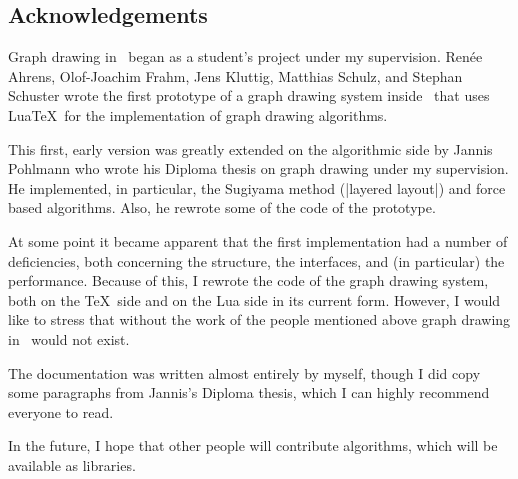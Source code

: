 \subsection{Acknowledgements}

Graph drawing in \tikzname\ began as a student's project under my
supervision. Ren\'ee Ahrens, Olof-Joachim Frahm, Jens
Kluttig, Matthias Schulz, and Stephan Schuster wrote the first
prototype of a graph drawing system inside \tikzname\ that uses
Lua\TeX\ for the implementation of graph drawing algorithms.

This first, early version was greatly extended on the algorithmic side
by Jannis Pohlmann who wrote his Diploma thesis on graph drawing under
my supervision. He implemented, in particular, the Sugiyama method
(|layered layout|) and force based algorithms. Also, he rewrote some
of the code of the prototype.

At some point it became apparent that the first implementation had a
number of deficiencies, both concerning the structure, the interfaces,
and (in particular) the performance. Because of this, I rewrote 
the code of the graph drawing system, both on the \TeX\ side
and on the Lua side in its current form. However, I would like to
stress that without the work of the people mentioned above graph
drawing in \tikzname\ would not exist.

The documentation was written almost entirely by myself, though I did
copy some paragraphs from Jannis's Diploma thesis, which I can highly
recommend everyone to read. 

In the future, I hope that other people will contribute algorithms,
which will be available as libraries.